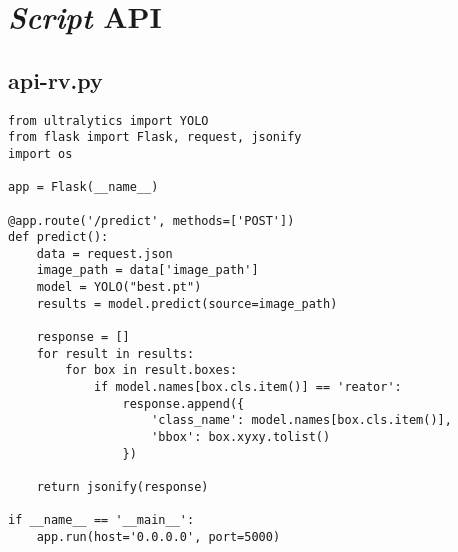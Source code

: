 
\chapter{\textit{Script} API}
\label{chap:script-api}

\section{api-rv.py}


\begin{lstlisting}
from ultralytics import YOLO
from flask import Flask, request, jsonify
import os

app = Flask(__name__)

@app.route('/predict', methods=['POST'])
def predict():
    data = request.json
    image_path = data['image_path']
    model = YOLO("best.pt")
    results = model.predict(source=image_path)

    response = []
    for result in results:
        for box in result.boxes:
            if model.names[box.cls.item()] == 'reator':
                response.append({
                    'class_name': model.names[box.cls.item()],
                    'bbox': box.xyxy.tolist()
                })

    return jsonify(response)

if __name__ == '__main__':
    app.run(host='0.0.0.0', port=5000)
\end{lstlisting}
